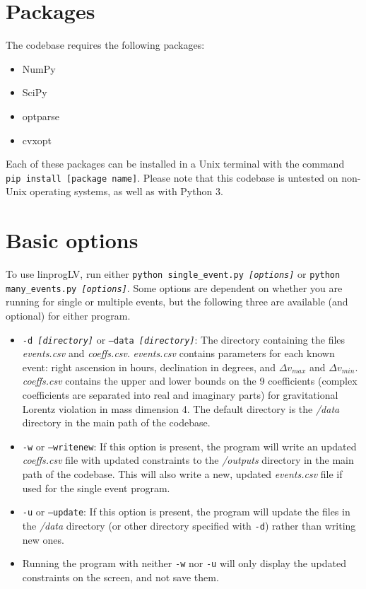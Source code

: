 \documentclass[11pt,notitlepage]{article}
\begin{document}
\section{Packages}
The codebase requires the following packages:
\begin{itemize}
    \item NumPy
    \item SciPy
    \item optparse
    \item cvxopt
\end{itemize}
Each of these packages can be installed in a Unix terminal with the command \texttt{pip install [package name]}. Please note that this codebase is untested on non-Unix operating systems, as well as with Python 3. 

\section{Basic options}
To use linprogLV, run either \texttt{python single\_event.py \textit{[options]}} or \texttt{python many\_events.py \textit{[options]}}. Some options are dependent on whether you are running for single or multiple events, but the following three are available (and optional) for either program.
\begin{itemize}
    \item \texttt{-d \textit{[directory]}} or \texttt{--data \textit{[directory]}}: The directory containing the files \textit{events.csv} and \textit{coeffs.csv}. \textit{events.csv} contains parameters for each known event: right ascension in hours, declination in degrees, and $\Delta v_{max}$ and $\Delta v_{min}$. \textit{coeffs.csv} contains the upper and lower bounds on the 9 coefficients (complex coefficients are separated into real and imaginary parts) for gravitational Lorentz violation in mass dimension 4. The default directory is the \textit{/data} directory in the main path of the codebase.
    \item \texttt{-w} or \texttt{--writenew}: If this option is present, the program will write an updated \textit{coeffs.csv} file with updated constraints to the \textit{/outputs} directory in the main path of the codebase. This will also write a new, updated \textit{events.csv} file if used for the single event program.
    \item \texttt{-u} or \texttt{--update}: If this option is present, the program will update the files in the \textit{/data} directory (or other directory specified with \texttt{-d}) rather than writing new ones.
    \item Running the program with neither \texttt{-w} nor \texttt{-u} will only display the updated constraints on the screen, and not save them.
\end{itemize}
\end{document}
